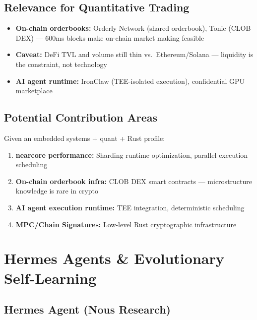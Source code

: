 \documentclass[11pt,a4paper]{article}
\begin{document}
\subsection{Relevance for Quantitative Trading}

\begin{itemize}
    \item \textbf{On-chain orderbooks:} Orderly Network (shared orderbook), Tonic (CLOB DEX) --- 600ms blocks make on-chain market making feasible
    \item \textbf{Caveat:} DeFi TVL and volume still thin vs.\ Ethereum/Solana --- liquidity is the constraint, not technology
    \item \textbf{AI agent runtime:} IronClaw (TEE-isolated execution), confidential GPU marketplace
\end{itemize}

\subsection{Potential Contribution Areas}

Given an embedded systems + quant + Rust profile:

\begin{enumerate}
    \item \textbf{nearcore performance:} Sharding runtime optimization, parallel execution scheduling
    \item \textbf{On-chain orderbook infra:} CLOB DEX smart contracts --- microstructure knowledge is rare in crypto
    \item \textbf{AI agent execution runtime:} TEE integration, deterministic scheduling
    \item \textbf{MPC/Chain Signatures:} Low-level Rust cryptographic infrastructure
\end{enumerate}

\newpage
\section{Hermes Agents \& Evolutionary Self-Learning}

\subsection{Hermes Agent (Nous Research)}
\end{document}
